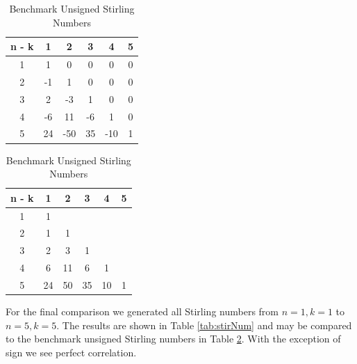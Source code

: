 \begin{table}[H]
    \parbox{.45\linewidth}{
    \centering
    \caption{Stirling Numbers Generated by Script}
    \begin{tabular}{cccccc}
    \hline
    n - k & 1 & 2 & 3 & 4 & 5\\
    \hline
    1 & 1 & 0 & 0 & 0 & 0\\
    
    2 & -1 & 1 & 0 & 0 & 0\\
    
    3 & 2 & -3 & 1 & 0 & 0\\
    
    4 & -6 & 11 & -6 & 1 & 0\\
    
    5 & 24 & -50 & 35 & -10 & 1\\
    \hline
    \end{tabular}
    \label{tab:stirNum}
    }
    \hfill
    \parbox{.45\linewidth}{
    \centering
    \caption{Benchmark Unsigned Stirling Numbers}
    \begin{tabular}{cccccc}
    \hline
    n - k & 1 & 2 & 3 & 4 & 5\\
    \hline
    1 & 1 &  &  &  & \\
    
    2 & 1 & 1 &  &  & \\
    
    3 & 2 & 3 & 1 &  & \\
    
    4 & 6 & 11 & 6 & 1 & \\
    
    5 & 24 & 50 & 35 & 10 & 1\\
    \hline
    \end{tabular}
    \label{tab:stirNumRef}
    }
\end{table}\noindent
For the final comparison we generated all Stirling numbers from $n=1,k=1$ to $n=5,k=5$. The results are shown in Table \ref{tab:stirNum} and may be compared to the benchmark unsigned Stirling numbers in Table \ref{tab:stirNumRef}. With the exception of sign we see perfect correlation.

